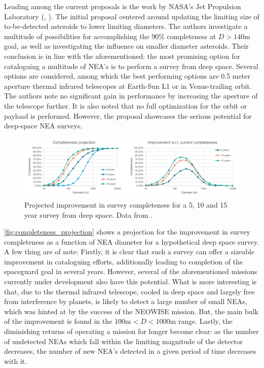 Leading among the current proposals is the work by NASA's Jet Propulsion Laboratory (\cite{2003NEOSDT}, \cite{2017NEOSDT}). The initial proposal centered around updating the limiting size of to-be-detected asteroids to lower limiting diameters. The authors investigate a multitude of possibilities for accomplishing the 90\% completeness at $D > 140 \mathrm{m}$ goal, as well as investigating the influence on smaller diameter asteroids. Their conclusion is in line with the aforementioned: the most promising option for cataloguing a multitude of NEA's is to perform a survey from deep space. Several options are considered, among which the best performing options are 0.5 meter aperture thermal infrared telescopes at Earth-Sun L1 or in Venus-trailing orbit. The authors note no significant gain in performance by increasing the aperture of the telescope further. It is also noted that no full optimization for the orbit or payload is performed. However, the proposal showcases the serious potential for deep-space NEA surveys. \\

\begin{figure}[htbp]
 \centering
 \includegraphics[width=1.0\textwidth]{img/completeness_projection.pdf}
 \caption{Projected improvement in survey completeness for a 5, 10 and 15 year survey from deep space. Data from \cite{2017NEOSDT}.}
 \label{fig:completeness_projection}
\end{figure}

\autoref{fig:completeness_projection} shows a projection for the improvement in survey completeness as a function of NEA diameter for a hypothetical deep space survey. A few thing are of note: Firstly, it is clear that such a survey can offer a sizeable improvement in cataloguing efforts, additionally leading to completion of the spaceguard goal in several years. However, several of the aforementioned missions currently under development also have this potential. What is more interesting is that, due to the thermal infrared telescope, cooled in deep space and largely free from interference by planets, is likely to detect a large number of small NEAs, which was hinted at by the success of the NEOWISE mission. But, the main bulk of the improvement is found in the $100 \mathrm{m} < D < 1000 \mathrm{m}$ range. Lastly, the diminishing returns of operating a mission for longer become clear: as the number of undetected NEAs which fall within the limiting magnitude of the detector decreases, the number of new NEA's detected in a given period of time decreases with it. \\

